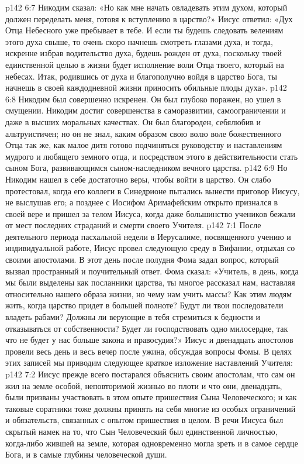 \vs p142 6:7 Никодим сказал: «Но как мне начать овладевать этим духом, который должен переделать меня, готовя к вступлению в царство?» Иисус ответил: «Дух Отца Небесного уже пребывает в тебе. И если ты будешь следовать велениям этого духа свыше, то очень скоро начнешь смотреть глазами духа, и тогда, искренне избрав водительство духа, будешь рожден от духа, поскольку твоей единственной целью в жизни будет исполнение воли Отца твоего, который на небесах. Итак, родившись от духа и благополучно войдя в царство Бога, ты начнешь в своей каждодневной жизни приносить обильные плоды духа».
\vs p142 6:8 Никодим был совершенно искренен. Он был глубоко поражен, но ушел в смущении. Никодим достиг совершенства в саморазвитии, самоограничении и даже в высших моральных качествах. Он был благороден, себялюбив и альтруистичен; но он не знал, каким образом  свою волю воле божественного Отца так же, как малое дитя готово подчиняться руководству и наставлениям мудрого и любящего земного отца, и посредством этого в действительности стать сыном Бога, развивающимся сыном\hyp{}наследником вечного царства.
\vs p142 6:9 Но Никодим нашел в себе достаточно веры, чтобы войти в царство. Он слабо протестовал, когда его коллеги в Синедрионе пытались вынести приговор Иисусу, не выслушав его; а позднее с Иосифом Аримафейским открыто признался в своей вере и пришел за телом Иисуса, когда даже большинство учеников бежали от мест последних страданий и смерти своего Учителя.
\vs p142 7:1 После деятельного периода пасхальной недели в Иерусалиме, посвященного учению и индивидуальной работе, Иисус провел следующую среду в Вифании, отдыхая со своими апостолами. В этот день после полудня Фома задал вопрос, который вызвал пространный и поучительный ответ. Фома сказал: «Учитель, в день, когда мы были выделены как посланники царства, ты многое рассказал нам, наставляя относительно нашего образа жизни, но чему нам учить массы? Как этим людям жить, когда царство придет в большей полноте? Будут ли твои последователи владеть рабами? Должны ли верующие в тебя стремиться к бедности и отказываться от собственности? Будет ли господствовать одно милосердие, так что не будет у нас больше закона и правосудия?» Иисус и двенадцать апостолов провели весь день и весь вечер после ужина, обсуждая вопросы Фомы. В целях этих записей мы приводим следующее краткое изложение наставлений Учителя:
\vs p142 7:2 Иисус прежде всего постарался объяснить своим апостолам, что сам он жил на земле особой, неповторимой жизнью во плоти и что они, двенадцать, были призваны участвовать в этом опыте пришествия Сына Человеческого; и как таковые соратники тоже должны принять на себя многие из особых ограничений и обязательств, связанных с опытом пришествия в целом. В речи Иисуса был скрытый намек на то, что Сын Человеческий был единственной личностью, когда\hyp{}либо жившей на земле, которая одновременно могла зреть и в самое сердце Бога, и в самые глубины человеческой души.
